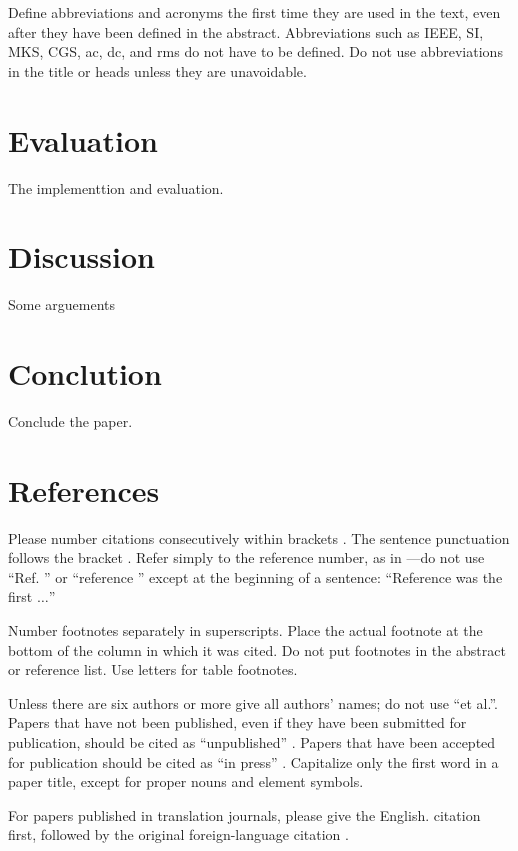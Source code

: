 \documentclass[conference]{IEEEtran}
\begin{document}
Define abbreviations and acronyms the first time they are used in the text, 
even after they have been defined in the abstract. Abbreviations such as 
IEEE, SI, MKS, CGS, ac, dc, and rms do not have to be defined. Do not use 
abbreviations in the title or heads unless they are unavoidable.

\section{Evaluation}

The implementtion and evaluation.

\section{Discussion}

Some arguements

\section{Conclution}

Conclude the paper.

\section*{References}

Please number citations consecutively within brackets \cite{b1}. The 
sentence punctuation follows the bracket \cite{b2}. Refer simply to the reference 
number, as in \cite{b3}---do not use ``Ref. \cite{b3}'' or ``reference \cite{b3}'' except at 
the beginning of a sentence: ``Reference \cite{b3} was the first $\ldots$''

Number footnotes separately in superscripts. Place the actual footnote at 
the bottom of the column in which it was cited. Do not put footnotes in the 
abstract or reference list. Use letters for table footnotes.

Unless there are six authors or more give all authors' names; do not use 
``et al.''. Papers that have not been published, even if they have been 
submitted for publication, should be cited as ``unpublished'' \cite{b4}. Papers 
that have been accepted for publication should be cited as ``in press'' \cite{b5}. 
Capitalize only the first word in a paper title, except for proper nouns and 
element symbols.

For papers published in translation journals, please give the English.
citation first, followed by the original foreign-language citation \cite{b6}.
\end{document}

